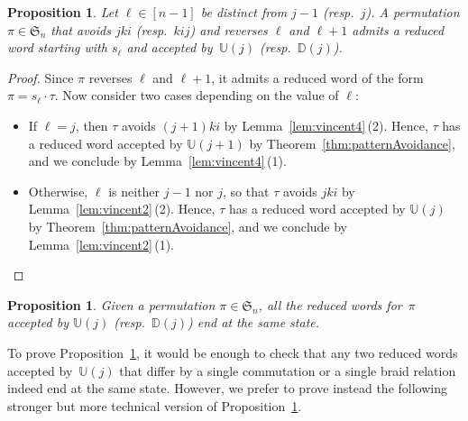 \documentclass[11pt]{article}
\newtheorem{proposition}[theo]{Proposition}
\theoremstyle{definition}
\numberwithin{equation}{section}
\newcommand{\fS}{\mathfrak{S}}
\newcommand{\automatonU}{\mathbb{U}}
\newcommand{\automatonD}{\mathbb{D}}
\begin{document}
\begin{proposition}\label{prop:algorithm}
Let $\ell \in [n-1]$ be distinct from $j-1$ (resp.~$j$).
A permutation $\pi \in \fS_n$ that avoids $jki$ (resp.~$kij$) and reverses $\ell$ and $\ell+1$ admits a reduced word starting with $s_\ell$ and accepted by~$\automatonU(j)$ (resp.~$\automatonD(j)$).
\end{proposition}

\begin{proof}
Since $\pi$ reverses $\ell$ and $\ell+1$, it admits a reduced word of the form~$\pi = s_\ell \cdot \tau$. Now consider two cases depending on the value of $\ell$:
\begin{itemize}
	\item If $\ell = j$, then $\tau$ avoids $(j+1)ki$ by Lemma~\ref{lem:vincent4}\,(2). Hence, $\tau$ has a reduced word accepted by $\automatonU(j+1)$ by Theorem~\ref{thm:patternAvoidance}, and we conclude by Lemma~\ref{lem:vincent4}\,(1).
	\item Otherwise, $\ell$ is neither $j-1$ nor $j$, so that $\tau$ avoids $jki$ by Lemma~\ref{lem:vincent2}\,(2). Hence, $\tau$ has a reduced word accepted by $\automatonU(j)$ by Theorem~\ref{thm:patternAvoidance}, and we conclude by Lemma~\ref{lem:vincent2}\,(1).
	\qedhere
\end{itemize}
\end{proof}

\begin{proposition}\label{prop:sameStateAcceptedReducedExpressions}
Given a permutation $\pi \in \fS_n$, all the reduced words for~$\pi$ accepted by $\automatonU(j)$ (resp.~$\automatonD(j)$) end at the same state.
\end{proposition}

To prove Proposition~\ref{prop:sameStateAcceptedReducedExpressions}, it would be enough to check that any two reduced words accepted by~$\automatonU(j)$ that differ by a single commutation or a single braid relation indeed end at the same state.
However, we prefer to prove instead the following stronger but more technical version of Proposition~\ref{prop:sameStateAcceptedReducedExpressions}.
\end{document}
